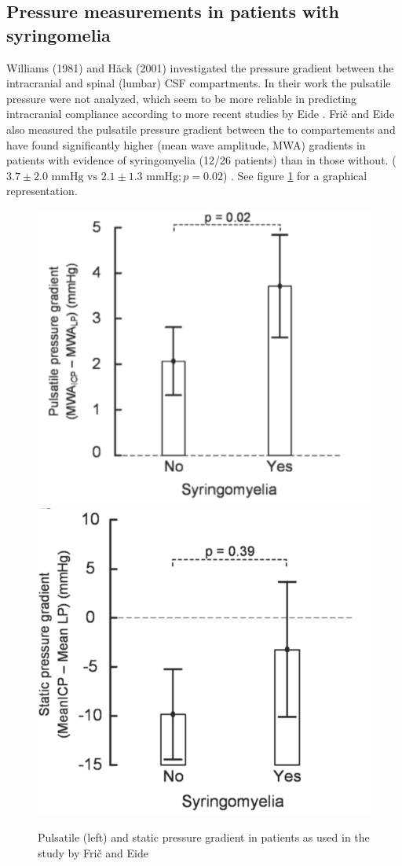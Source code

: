 \subsection{Pressure measurements in patients with syringomelia}
Williams (1981) \cite{Will81} and H{\"a}ck (2001) \cite{Hack01} investigated the pressure gradient between the intracranial and spinal (lumbar) CSF compartments. In their work the pulsatile pressure were not analyzed, which seem to be more reliable in predicting intracranial compliance according to more recent studies by Eide \cite{Eide11_Rand,Eide10_Amp,Eide11_Hyper,Eide10_Diag}.
Fri{\v{c}} and Eide also measured the pulsatile pressure gradient between the to compartements and have found significantly higher (mean wave amplitude, MWA) gradients in patients with evidence of syringomyelia (12/26 patients) than in those without. ($3.7 \pm 2.0 \text{ mmHg vs } 2.1 \pm 1.3 \text{ mmHg}; p=0.02$) \cite{Fric15}. See figure \ref{fig:Syrinx} for a graphical representation. 
\begin{center}
\begin{figure}[!ht]
\includegraphics[width=0.4\linewidth]{figures/Eide_pressure_Syrinx}
\includegraphics[width=0.375\linewidth]{figures/Eide_static}
\caption{Pulsatile (left) and static pressure gradient in patients as used in the study by Fri{\v{c}} and Eide \cite{Fric15}}\label{fig:Syrinx}
\end{figure}
\end{center}
